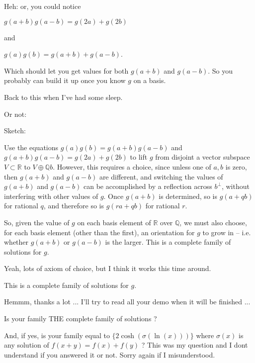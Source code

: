 \begin{solution}
	Heh: or, you could notice

$ g(a+b)g(a-b) = g(2a) + g(2b)$

and 

$ g(a)g(b) = g(a+b)+g(a-b)$.

Which should let you get values for both $ g(a+b)$ and $ g(a-b)$. So you probably can build it up once you know $ g$ on a basis.

Back to this when I've had some sleep.
\end{solution}



\begin{solution}
	Or not: 

Sketch: 

Use the equations $ g(a)g(b) = g(a+b)g(a-b)$ and $ g(a+b)g(a-b) = g(2a) + g(2b)$ to lift $ g$ from disjoint
a vector subspace $ V \subset \mathbb{R}$ to $ V \oplus \mathbb{Q}b$. However, this requires a choice, since
unless one of $ a,b$ is zero, then $ g(a+b)$ and $ g(a-b)$ are different, and switching the 
values of $ g(a+b)$ and $ g(a-b)$ can be accomplished by a reflection across $ b^\perp$, without interfering
with other values of $ g$. Once $ g(a+b)$ is determined, so is $ g(a + qb)$ for rational $ q$, and therefore so is $ g(ra + qb)$ for rational $ r$.

So, given the value of $ g$ on each basis element of $ \mathbb{R}$ over $ \mathbb{Q}$, 
we must also choose, for each basis element (other than the first), an orientation for $ g$ to grow in --
i.e. whether $ g(a+b)$ or $ g(a-b)$ is the larger. This is a complete family of solutions for $ g$.

Yeah, lots of axiom of choice, but I think it works this time around.
\end{solution}



\begin{solution}
	\begin{tcolorbox} This is a complete family of solutions for $ g$.\end{tcolorbox}
Hemmm, thanks a lot ...
I'll try to read all your demo when it will be finished ...

Is your family THE complete family of solutions ?

And, if yes, is your family equal to $ \{2\cosh(\sigma(\ln(x)))\}$ where $ \sigma(x)$ is any solution of $ f(x + y) = f(x) + f(y)$ ?
This was my question and I dont understand if you answered it or not.
Sorry again if I misunderstood.
\end{solution}



